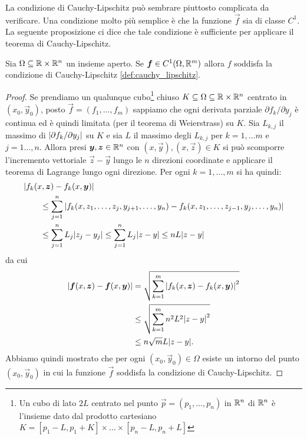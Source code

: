 La condizione di Cauchy-Lipschitz può sembrare piuttosto complicata
da verificare. Una condizione molto più semplice  è che la funzione $\vec f$
sia di classe $C^1$. La seguente proposizione ci dice che tale
condizione è sufficiente per applicare il teorema di Cauchy-Lipschitz.

\begin{proposition}
\mymark{***}
Sia $\Omega \subseteq \mathbb R\times \mathbb R^n$ un insieme aperto.
Se $\boldsymbol f\in C^1(\Omega,\mathbb R^m)$ allora $f$ soddisfa la condizione
di Cauchy-Lipschitz \ref{def:cauchy_lipschitz}.
\end{proposition}
%
\begin{proof}
\mymark{***}
Se prendiamo un qualunque cubo\footnote{%
Un cubo di lato $2L$ centrato nel punto $\vec p = (p_1,\dots,p_n)$
in $\mathbb R^n$ di $\mathbb R^n$ è l'insieme dato dal prodotto cartesiano
$K=[p_1-L,p_1+K]\times \dots \times [p_n-L,p_n+L]$}
chiuso $K \subseteq \Omega \subseteq \mathbb R\times \mathbb R^n$
centrato in $(x_0,\vec y_0)$, posto $\vec f = (f_1, \dots, f_m)$
sappiamo che ogni derivata parziale
$\partial f_k / \partial y_j$ è continua ed è quindi limitata
(per il teorema di Weierstrass) su $K$. Sia $L_{k,j}$ il massimo di ${\left|\partial f_k / \partial y_j\right|}$ su $K$ e sia
$L$ il massimo degli $L_{k,j}$ per $k=1,\dots m$ e $j=1\dots,n$.
Allora presi $\boldsymbol y, \boldsymbol z \in \mathbb R^n$ con $(x,\vec y),(x,\vec z)\in K$ si può scomporre l'incremento vettoriale $\vec z - \vec y$ lungo le $n$ direzioni coordinate e applicare il teorema di Lagrange lungo ogni direzione.
Per ogni $k = 1,\dots, m$ si ha quindi:
\begin{align*}
\MoveEqLeft
\abs{f_k(x,\vec z)-f_k(x,\vec y)}\\
&\le \sum_{j=1}^n \abs{f_k(x,z_1, \dots, z_j, y_{j+1}, \dots, y_n) - f_k(x,z_1, \dots, z_{j-1}, y_j, \dots, y_n)}\\
&\le \sum_{j=1}^n L_j \abs{z_j-y_j}
\le \sum_{j=1}^n L_j \abs{z-y}
\le n L \abs{z-y}
\end{align*}
da cui
\begin{align*}
  {\left|\boldsymbol f(x,\boldsymbol z) - \boldsymbol f(x,\boldsymbol y)\right|}
  &= \sqrt{\sum_{k=1}^m {\left|f_k(x,\boldsymbol z) - f_k(x,\boldsymbol y)\right|}^2} \\
  &\le \sqrt{\sum_{k=1}^m n^2 L^2 {\left|z-y\right|}^2} \\
  &\le n\sqrt{m} L {\left|z-y\right|}.
\end{align*}
Abbiamo quindi mostrato che per ogni $(x_0,\vec y_0)\in \Omega$ esiste un intorno del punto $(x_0,\vec y_0)$ in cui la funzione $\vec f$ soddisfa la condizione di Cauchy-Lipschitz.
\end{proof}


